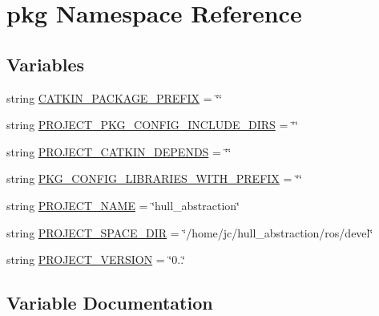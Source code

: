 \hypertarget{namespacepkg}{}\section{pkg Namespace Reference}
\label{namespacepkg}
\subsection*{Variables}
\begin{DoxyCompactItemize}
\item 
string \hyperlink{namespacepkg_ae26c7a5a06b7d738f4d210ca449e6bee}{C\+A\+T\+K\+I\+N\+\_\+\+P\+A\+C\+K\+A\+G\+E\+\_\+\+P\+R\+E\+F\+IX} = \char`\"{}\char`\"{}
\item 
string \hyperlink{namespacepkg_a2760bf8266ff58da440f65ee91b203ab}{P\+R\+O\+J\+E\+C\+T\+\_\+\+P\+K\+G\+\_\+\+C\+O\+N\+F\+I\+G\+\_\+\+I\+N\+C\+L\+U\+D\+E\+\_\+\+D\+I\+RS} = \char`\"{}\char`\"{}
\item 
string \hyperlink{namespacepkg_a17c18447fad253ee1c0d76deec88028c}{P\+R\+O\+J\+E\+C\+T\+\_\+\+C\+A\+T\+K\+I\+N\+\_\+\+D\+E\+P\+E\+N\+DS} = \char`\"{}\char`\"{}
\item 
string \hyperlink{namespacepkg_a433e30cecb4a0123a7c4b384d168e336}{P\+K\+G\+\_\+\+C\+O\+N\+F\+I\+G\+\_\+\+L\+I\+B\+R\+A\+R\+I\+E\+S\+\_\+\+W\+I\+T\+H\+\_\+\+P\+R\+E\+F\+IX} = \char`\"{}\char`\"{}
\item 
string \hyperlink{namespacepkg_a7dfbe99257c26f5e4a3a5483995d9ddc}{P\+R\+O\+J\+E\+C\+T\+\_\+\+N\+A\+ME} = \char`\"{}hull\+\_\+abstraction\char`\"{}
\item 
string \hyperlink{namespacepkg_a3f0f1b4bc03c596525e025539ca4332f}{P\+R\+O\+J\+E\+C\+T\+\_\+\+S\+P\+A\+C\+E\+\_\+\+D\+IR} = \char`\"{}/home/jc/hull\+\_\+abstraction/ros/devel\char`\"{}
\item 
string \hyperlink{namespacepkg_ab1037914b9286bb61855131c06149648}{P\+R\+O\+J\+E\+C\+T\+\_\+\+V\+E\+R\+S\+I\+ON} = \char`\"{}0..\char`\"{}
\end{DoxyCompactItemize}


\subsection{Variable Documentation}
